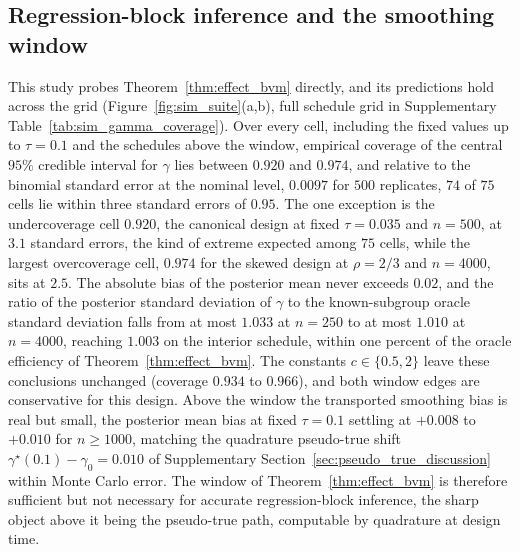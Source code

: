 \documentclass[11pt]{article}
\theoremstyle{definition}
\theoremstyle{plain}
\begin{document}
\subsection{Regression-block inference and the smoothing window}
\label{sec:sim_effect_block}

This study probes Theorem~\ref{thm:effect_bvm} directly, and its predictions hold across the grid (Figure~\ref{fig:sim_suite}(a,b), full schedule grid in Supplementary Table~\ref{tab:sim_gamma_coverage}). Over every cell, including the fixed values up to $\tau=0.1$ and the schedules above the window, empirical coverage of the central $95\%$ credible interval for $\gamma$ lies between $0.920$ and $0.974$, and relative to the binomial standard error at the nominal level, $0.0097$ for $500$ replicates, $74$ of $75$ cells lie within three standard errors of $0.95$. The one exception is the undercoverage cell $0.920$, the canonical design at fixed $\tau=0.035$ and $n=500$, at $3.1$ standard errors, the kind of extreme expected among $75$ cells, while the largest overcoverage cell, $0.974$ for the skewed design at $\rho=2/3$ and $n=4000$, sits at $2.5$. The absolute bias of the posterior mean never exceeds $0.02$, and the ratio of the posterior standard deviation of $\gamma$ to the known-subgroup oracle standard deviation falls from at most $1.033$ at $n=250$ to at most $1.010$ at $n=4000$, reaching $1.003$ on the interior schedule, within one percent of the oracle efficiency of Theorem~\ref{thm:effect_bvm}. The constants $c\in\{0.5,2\}$ leave these conclusions unchanged (coverage $0.934$ to $0.966$), and both window edges are conservative for this design. Above the window the transported smoothing bias is real but small, the posterior mean bias at fixed $\tau=0.1$ settling at $+0.008$ to $+0.010$ for $n\ge1000$, matching the quadrature pseudo-true shift $\gamma^\star(0.1)-\gamma_0=0.010$ of Supplementary Section~\ref{sec:pseudo_true_discussion} within Monte Carlo error. The window of Theorem~\ref{thm:effect_bvm} is therefore sufficient but not necessary for accurate regression-block inference, the sharp object above it being the pseudo-true path, computable by quadrature at design time.
\end{document}

